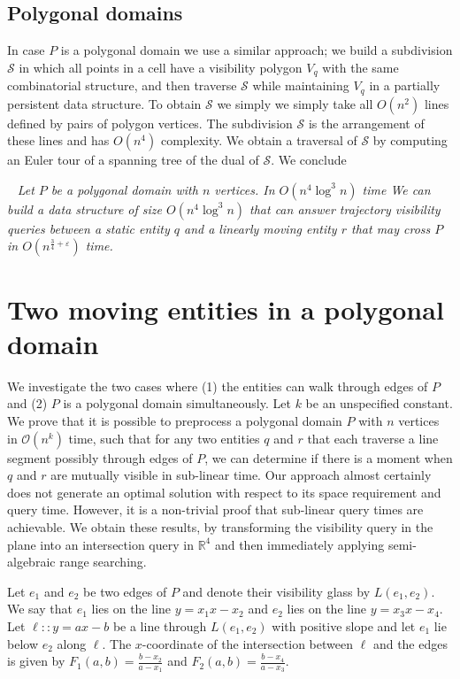 \documentclass[UKenglish]{lipics-v2019}
\newcommand{\mkmcal}[1]{\ensuremath{\mathcal{#1}}\xspace}
\renewcommand{\S}{\mkmcal{S}}
\newcommand{\eps}{\ensuremath{\varepsilon}\xspace}
\newcommand{\thmheadfont}{\textcolor{darkgray}{$\blacktriangleright$}\nobreakspace\sffamily\bfseries}
\newenvironment{repeatenv}[2]%
  {\smallskip\noindent {\thmheadfont #1~\ref{#2}.}\ \slshape}
  {\normalfont}
\newenvironment{repeattheorem}    [1]{\begin{repeatenv}{Theorem}{#1}}    {\end{repeatenv}}
\begin{document}
\subsection{Polygonal domains}
In case $P$ is a polygonal domain we use a
similar approach; we build a subdivision \S in which all points in a cell have
a visibility polygon $V_q$ with the same combinatorial structure, and then
traverse \S while maintaining $V_q$ in a partially persistent data
structure. To obtain \S we simply we simply take all $O(n^2)$ lines defined by
pairs of polygon vertices. The subdivision \S is the arrangement of these lines
and has $O(n^4)$ complexity. We obtain a traversal of \S by computing an Euler
tour of a spanning tree of the dual of \S. We conclude

\begin{repeattheorem}{thm:full_domain}
  Let $P$ be a polygonal domain with $n$ vertices. In $O(n^4\log^3 n)$ time We
  can build a data structure of size $O(n^4\log^3 n)$ that can answer
  trajectory visibility queries between a static entity $q$ and a linearly
  moving entity $r$ that may cross $P$ in $O(n^{\frac{3}{4}+\eps})$ time.
\end{repeattheorem}

\section{Two moving entities in a polygonal domain}
\label{app:Two_moving_entities_in_a_polygonal_domain}

We investigate the two cases where (1) the entities can walk through edges of $P$ and (2) $P$ is a polygonal domain simultaneously. Let $k$ be an unspecified constant. We prove that it is possible to preprocess a polygonal domain $P$ with $n$ vertices in $\mathcal{O}(n^k)$ time, such that for any two entities $q$ and $r$ that each traverse a line segment possibly through edges of $P$, we can determine if there is a moment when $q$ and $r$ are mutually visible in sub-linear time. Our approach almost certainly does not generate an optimal solution with respect to its space requirement and query time. However, it is a non-trivial proof that sub-linear query times are achievable. We obtain these results, by transforming the visibility query in the plane into an intersection query in $\mathbb{R}^4$ and then immediately applying semi-algebraic range searching. 



Let $e_1$ and $e_2$ be two edges of $P$ and denote their visibility glass by $L(e_1, e_2)$. We say that $e_1$ lies on the line $y = x_1 x - x_2$ and $e_2$ lies on the line $y = x_3 x - x_4$. Let $\ell :: y = ax - b$ be a line through $L(e_1, e_2)$ with positive slope and let $e_1$ lie below $e_2$ along $\ell$. The $x$-coordinate of the intersection between $\ell$ and the edges is given by $F_1(a,b) = \frac{b-x_2}{a - x_1}$ and $F_2(a,b) = \frac{b - x_4}{a - x_3}$.
\end{document}
